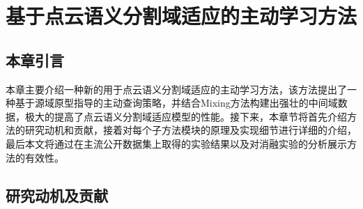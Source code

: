 

\chapter{基于点云语义分割域适应的主动学习方法}
\thispagestyle{others}
\pagestyle{others}
\xiaosi

\section{本章引言}
本章主要介绍一种新的用于点云语义分割域适应的主动学习方法，该方法提出了一种基于源域原型指导的主动查询策略，并结合Mixing方法构建出强壮的中间域数据，极大的提高了点云语义分割域适应模型的性能。接下来，本章节将首先介绍方法的研究动机和贡献，接着对每个子方法模块的原理及实现细节进行详细的介绍，最后本文将通过在主流公开数据集上取得的实验结果以及对消融实验的分析展示方法的有效性。

\section{研究动机及贡献}



